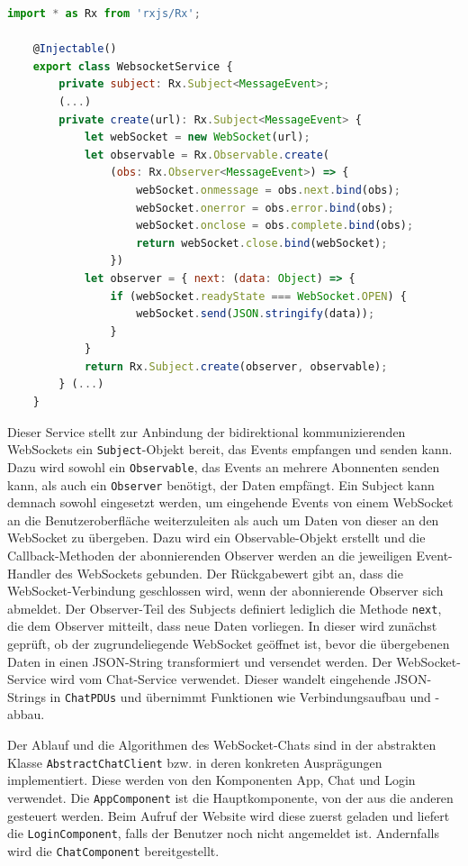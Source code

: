 \documentclass[11pt,a4paper,titlepage]{scrartcl}
\numberwithin{equation}{section}
\begin{document}
\begin{lstlisting}[frame=single, language=JavaScript, caption=WebSocket-Client: WebSocket-Service, label=lst:wsClientWS]
	import * as Rx from 'rxjs/Rx';

	@Injectable()
	export class WebsocketService {
		private subject: Rx.Subject<MessageEvent>;
		(...)
		private create(url): Rx.Subject<MessageEvent> {
			let webSocket = new WebSocket(url);
			let observable = Rx.Observable.create(
				(obs: Rx.Observer<MessageEvent>) => {
					webSocket.onmessage = obs.next.bind(obs);
					webSocket.onerror = obs.error.bind(obs);
					webSocket.onclose = obs.complete.bind(obs);
					return webSocket.close.bind(webSocket);
				})
			let observer = { next: (data: Object) => {
				if (webSocket.readyState === WebSocket.OPEN) {
					webSocket.send(JSON.stringify(data));
				}
			}
			return Rx.Subject.create(observer, observable);
		} (...)
	}
\end{lstlisting}

\noindent Dieser Service stellt zur Anbindung der bidirektional kommunizierenden WebSockets ein \texttt{Subject}-Objekt bereit, das Events empfangen und senden kann. Dazu wird sowohl ein \texttt{Observable}, das Events an mehrere Abonnenten senden kann, als auch ein \texttt{Observer} benötigt, der Daten empfängt. Ein Subject kann demnach sowohl eingesetzt werden, um eingehende Events von einem WebSocket an die Benutzeroberfläche weiterzuleiten als auch um Daten von dieser an den WebSocket zu übergeben. Dazu wird ein Observable-Objekt erstellt und die Callback-Methoden der abonnierenden Observer werden an die jeweiligen Event-Handler des WebSockets gebunden. Der Rückgabewert gibt an, dass die WebSocket-Verbindung geschlossen wird, wenn der abonnierende Observer sich abmeldet. Der Observer-Teil des Subjects definiert lediglich die Methode \texttt{next}, die dem Observer mitteilt, dass neue Daten vorliegen. In dieser wird zunächst geprüft, ob der zugrundeliegende WebSocket geöffnet ist, bevor die übergebenen Daten in einen JSON-String transformiert und versendet werden. Der WebSocket-Service wird vom Chat-Service verwendet. Dieser wandelt eingehende JSON-Strings in \texttt{ChatPDUs} und übernimmt Funktionen wie Verbindungsaufbau und -abbau.

\noindent Der Ablauf und die Algorithmen des WebSocket-Chats sind in der abstrakten Klasse \texttt{AbstractChatClient} bzw. in deren konkreten Ausprägungen implementiert. Diese werden von den Komponenten App, Chat und Login verwendet. Die \texttt{AppComponent} ist die Hauptkomponente, von der aus die anderen gesteuert werden. Beim Aufruf der Website wird diese zuerst geladen und liefert die \texttt{LoginComponent}, falls der Benutzer noch nicht angemeldet ist. Andernfalls wird die \texttt{ChatComponent} bereitgestellt. \medskip
\end{document}
